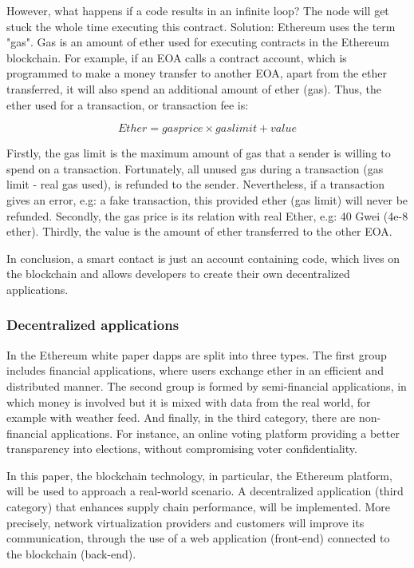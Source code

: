 However, what happens if a code results in an infinite loop? The node will get stuck the whole time executing this contract. Solution: Ethereum uses the term "gas". Gas is an amount of ether used for executing contracts in the Ethereum blockchain. For example, if an EOA calls a contract account, which is programmed to make a money transfer to another EOA, apart from the ether transferred, it will also spend an additional amount of ether (gas). Thus, the ether used for a transaction, or transaction fee is:

$$Ether = gas price \times gas limit + value$$

Firstly, the gas limit is the maximum amount of gas that a sender is willing to spend on a transaction. Fortunately, all unused gas during a transaction (gas limit - real gas used), is refunded to the sender. Nevertheless, if a transaction gives an error, e.g: a fake transaction, this provided ether (gas limit) will never be refunded. Secondly, the gas price is its relation with real Ether, e.g: 40 Gwei (4e-8 ether). Thirdly, the value is the amount of ether transferred to the other EOA.

In conclusion, a smart contact is just an account containing code, which lives on the blockchain and allows developers to create their own decentralized applications. 

\subsubsection{Decentralized applications}

In the Ethereum white paper \cite{buterin2014next} dapps are split into three types. The first group includes financial applications, where users exchange ether in an efficient and distributed manner. The second group is formed by semi-financial applications, in which money is involved but it is mixed with data from the real world, for example with weather feed. And finally, in the third category, there are non-financial applications. For instance, an online voting platform providing a better transparency into elections, without compromising voter confidentiality.

In this paper, the blockchain technology, in particular, the Ethereum platform, will be used to approach a real-world scenario. A decentralized application (third category) that enhances supply chain performance, will be implemented. More precisely, network virtualization providers and customers will improve its communication, through the use of a web application (front-end) connected to the blockchain (back-end).


